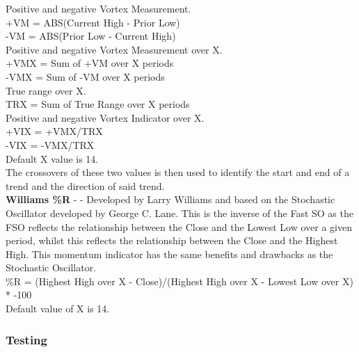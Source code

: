 \documentclass[conference]{IEEEtran}
\begin{document}
\noindent
Positive and negative Vortex Measurement.\\
+VM = ABS(Current High - Prior Low)\\
-VM = ABS(Prior Low - Current High)\\

\noindent
Positive and negative Vortex Measurement over X.\\
+VMX = Sum of +VM over X periods \\
-VMX = Sum of -VM over X periods \\

\noindent
True range over X.\\
TRX = Sum of True Range over X periods \\

\noindent
Positive and negative Vortex Indicator over X.\\
+VIX = +VMX/TRX \\
-VIX = -VMX/TRX \\

\noindent
Default X value is 14.\\

\noindent
The crossovers of these two values is then used to identify the start and end of a trend and the direction of said trend.\\

\noindent
\textbf{Williams \%R} - \cite{Murphy1999} - Developed by Larry Williams and based on the Stochastic Oscillator developed by George C. Lane. This is the inverse of the Fast SO as the FSO reflects the relationship between the Close and the Lowest Low over a given period, whilst this reflects the relationship between the Close and the Highest High. This momentum indicator has the same benefits and drawbacks as the Stochastic Oscillator.\\

\noindent
\%R = (Highest High over X - Close)/(Highest High over X - Lowest Low over X) * -100\\
Default value of X is 14.\\

\subsubsection{Testing}
\end{document}
